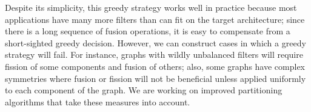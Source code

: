 Despite its simplicity, this greedy strategy works well in practice
because most applications have many more filters than can fit on the
target architecture; since there is a long sequence of fusion
operations, it is easy to compensate from a short-sighted greedy
decision.  However, we can construct cases in which a greedy strategy
will fail.  For instance, graphs with wildly unbalanced filters will
require fission of some components and fusion of others; also, some
graphs have complex symmetries where fusion or fission will not be
beneficial unless applied uniformly to each component of the graph.
We are working on improved partitioning algorithms that take these
measures into account.

